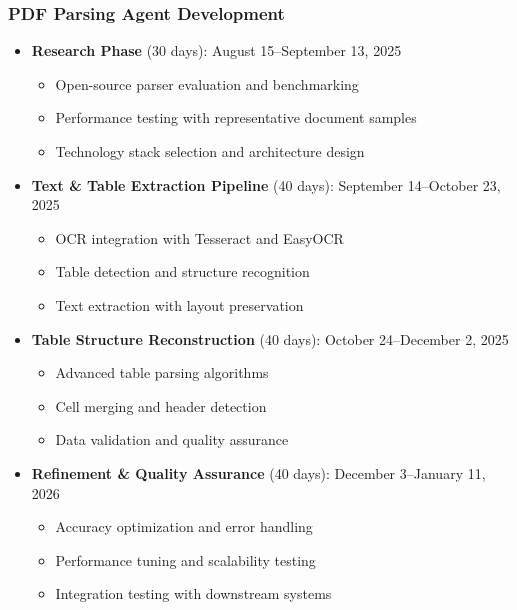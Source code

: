 \documentclass[12pt]{report}
\begin{document}
\subsubsection{PDF Parsing Agent Development}
\begin{itemize}
  \item \textbf{Research Phase} (30 days): August 15--September 13, 2025
    \begin{itemize}
      \item Open-source parser evaluation and benchmarking
      \item Performance testing with representative document samples
      \item Technology stack selection and architecture design
    \end{itemize}
  \item \textbf{Text \& Table Extraction Pipeline} (40 days): September 14--October 23, 2025
    \begin{itemize}
      \item OCR integration with Tesseract and EasyOCR
      \item Table detection and structure recognition
      \item Text extraction with layout preservation
    \end{itemize}
  \item \textbf{Table Structure Reconstruction} (40 days): October 24--December 2, 2025
    \begin{itemize}
      \item Advanced table parsing algorithms
      \item Cell merging and header detection
      \item Data validation and quality assurance
    \end{itemize}
  \item \textbf{Refinement \& Quality Assurance} (40 days): December 3--January 11, 2026
    \begin{itemize}
      \item Accuracy optimization and error handling
      \item Performance tuning and scalability testing
      \item Integration testing with downstream systems
    \end{itemize}
\end{itemize}
\end{document}
